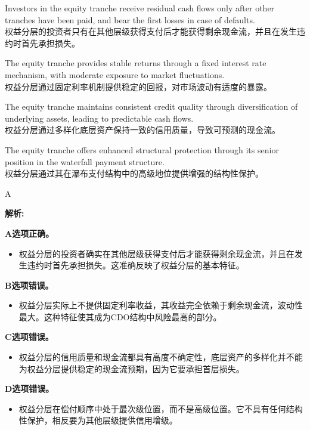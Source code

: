 \documentclass{article}
\newenvironment{explanation}
{\textbf{解析:}\par}
{\par}
\begin{document}
\begin{choices}
    \item Investors in the equity tranche receive residual cash flows only after other tranches have been paid, and bear the first losses in case of defaults.\\
    权益分层的投资者只有在其他层级获得支付后才能获得剩余现金流，并且在发生违约时首先承担损失。
    \item The equity tranche provides stable returns through a fixed interest rate mechanism, with moderate exposure to market fluctuations.\\
    权益分层通过固定利率机制提供稳定的回报，对市场波动有适度的暴露。
    \item The equity tranche maintains consistent credit quality through diversification of underlying assets, leading to predictable cash flows.\\
    权益分层通过多样化底层资产保持一致的信用质量，导致可预测的现金流。
    \item The equity tranche offers enhanced structural protection through its senior position in the waterfall payment structure.\\
    权益分层通过其在瀑布支付结构中的高级地位提供增强的结构性保护。
\end{choices}

\begin{correctanswer}
    A
\end{correctanswer}

\begin{explanation}
    \textbf{A选项正确。}
    \begin{itemize}
        \item 权益分层的投资者确实在其他层级获得支付后才能获得剩余现金流，并且在发生违约时首先承担损失。这准确反映了权益分层的基本特征。
    \end{itemize}

    \textbf{B选项错误。}
    \begin{itemize}
        \item 权益分层实际上不提供固定利率收益，其收益完全依赖于剩余现金流，波动性最大。这种特征使其成为CDO结构中风险最高的部分。
    \end{itemize}

    \textbf{C选项错误。}
    \begin{itemize}
        \item 权益分层的信用质量和现金流都具有高度不确定性，底层资产的多样化并不能为权益分层提供稳定的现金流预期，因为它要承担首层损失。
    \end{itemize}

    \textbf{D选项错误。}
    \begin{itemize}
        \item 权益分层在偿付顺序中处于最次级位置，而不是高级位置。它不具有任何结构性保护，相反要为其他层级提供信用增级。
    \end{itemize}
\end{explanation}
\end{document}
